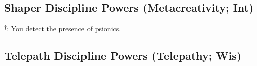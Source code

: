 \subsection{Shaper Discipline Powers {\normalsize(Metacreativity; Int)}}
\begin{enumerate*}
\item
\item {}\textsuperscript{$\dagger$}: You detect the presence of psionics.
\item
\item
\item
\item
\item
\item
\item
\end{enumerate*}



\subsection{Telepath Discipline Powers {\normalsize(Telepathy; Wis)}}
\begin{enumerate*}
\item
\item
\item
\item
\item
\item
\item
\item
\item
\end{enumerate*}